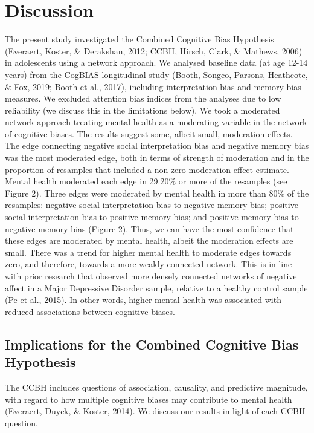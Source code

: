 \documentclass[
  english,
  man]{apa6}
\begin{document}
\hypertarget{discussion}{%
\section{Discussion}\label{discussion}}

The present study investigated the Combined Cognitive Bias Hypothesis (Everaert, Koster, \& Derakshan, 2012; CCBH, Hirsch, Clark, \& Mathews, 2006) in adolescents using a network approach. We analysed baseline data (at age 12-14 years) from the CogBIAS longitudinal study (Booth, Songco, Parsons, Heathcote, \& Fox, 2019; Booth et al., 2017), including interpretation bias and memory bias measures. We excluded attention bias indices from the analyses due to low reliability (we discuss this in the limitations below). We took a moderated network approach treating mental health as a moderating variable in the network of cognitive biases. The results suggest some, albeit small, moderation effects. The edge connecting negative social interpretation bias and negative memory bias was the most moderated edge, both in terms of strength of moderation and in the proportion of resamples that included a non-zero moderation effect estimate. Mental health moderated each edge in 29.20\% or more of the resamples (see Figure 2). Three edges were moderated by mental health in more than 80\% of the resamples: negative social interpretation bias to negative memory bias; positive social interpretation bias to positive memory bias; and positive memory bias to negative memory bias (Figure 2). Thus, we can have the most confidence that these edges are moderated by mental health, albeit the moderation effects are small. There was a trend for higher mental health to moderate edges towards zero, and therefore, towards a more weakly connected network. This is in line with prior research that observed more densely connected networks of negative affect in a Major Depressive Disorder sample, relative to a healthy control sample (Pe et al., 2015). In other words, higher mental health was associated with reduced associations between cognitive biases.

\hypertarget{implications-for-the-combined-cognitive-bias-hypothesis}{%
\subsection{Implications for the Combined Cognitive Bias Hypothesis}\label{implications-for-the-combined-cognitive-bias-hypothesis}}

The CCBH includes questions of association, causality, and predictive magnitude, with regard to how multiple cognitive biases may contribute to mental health (Everaert, Duyck, \& Koster, 2014). We discuss our results in light of each CCBH question.
\end{document}
